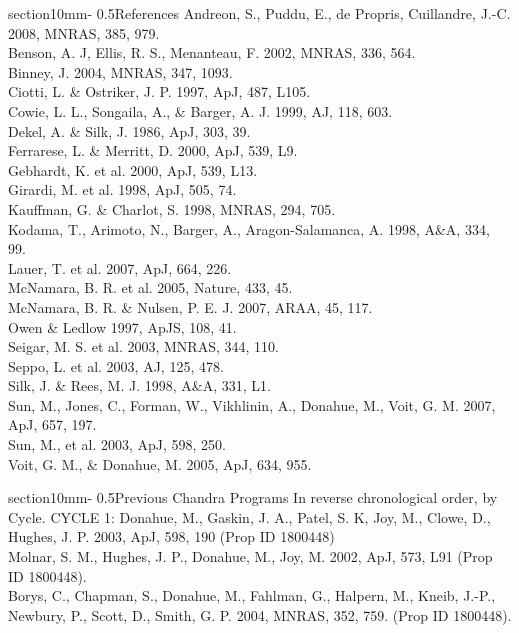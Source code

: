 \documentclass[letterpaper,11pt]{article}
\makeatletter
\renewcommand{\section}{\@startsection%
{section}{1}{0mm}{-\baselineskip}%
{0.5\baselineskip}{\normalfont\Large\bfseries}}%
\makeatother
\begin{document}
\section{References}
Andreon, S., Puddu, E., de Propris, Cuillandre, J.-C. 2008, MNRAS, 385, 979.\\
Benson, A. J, Ellis, R. S., Menanteau, F. 2002, MNRAS, 336, 564.\\
Binney, J. 2004, MNRAS, 347, 1093.\\
Ciotti, L. \& Ostriker, J. P. 1997, ApJ, 487, L105.\\
Cowie, L. L., Songaila, A., \& Barger, A. J. 1999, AJ, 118, 603.\\
Dekel, A.  \& Silk, J. 1986, ApJ, 303, 39.\\
Ferrarese, L. \& Merritt, D. 2000, ApJ, 539, L9.\\
Gebhardt, K. et al. 2000, ApJ, 539, L13.\\
Girardi, M. et al. 1998, ApJ, 505, 74.\\
Kauffman, G. \& Charlot, S. 1998, MNRAS, 294, 705.\\
Kodama, T., Arimoto, N., Barger, A., Aragon-Salamanca, A. 1998, A\&A, 334, 99.\\
Lauer, T. et al. 2007, ApJ, 664, 226.\\
McNamara, B. R. et al. 2005, Nature, 433, 45.\\
McNamara, B. R. \& Nulsen, P. E. J. 2007, ARAA, 45, 117.\\
Owen \& Ledlow 1997, ApJS, 108, 41.\\
Seigar, M. S. et al. 2003, MNRAS, 344, 110.\\
Seppo, L. et al. 2003, AJ, 125, 478.\\
Silk, J. \& Rees, M. J. 1998, A\&A, 331, L1.\\
Sun, M., Jones, C., Forman, W., Vikhlinin, A., Donahue, M., Voit, G. M. 2007, ApJ, 657, 197.\\
Sun, M., et al. 2003, ApJ, 598, 250.\\
Voit, G. M., \& Donahue, M. 2005, ApJ, 634, 955.

\onecolumn

\section{Previous Chandra Programs}
In reverse chronological order, by Cycle.
CYCLE 1:
Donahue, M., Gaskin, J. A., Patel, S. K, Joy, M., Clowe, D., Hughes, J. P. 2003, ApJ, 598, 190 (Prop ID 1800448)\\
Molnar, S. M., Hughes, J. P., Donahue, M., Joy, M. 2002, ApJ, 573, L91 (Prop ID 1800448).\\
Borys, C., Chapman, S., Donahue, M., Fahlman, G., Halpern, M., Kneib, J.-P., Newbury, P., Scott, D., Smith, G. P. 
2004, MNRAS, 352, 759. (Prop ID 1800448).\\
\end{document}
